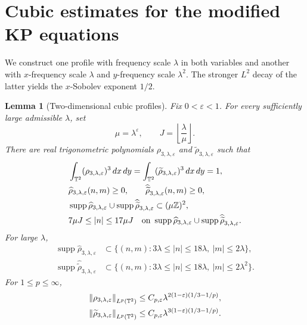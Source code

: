 \documentclass[12pt,reqno,letterpaper]{amsart}
\numberwithin{equation}{section}
\newtheorem{lemma}[theorem]{Lemma}
\theoremstyle{definition}
\newcommand{\T}{\mathbb T}
\newcommand{\Z}{\mathbb Z}
\newcommand{\eps}{\varepsilon}
\newcommand{\la}{\lambda}
\newcommand{\supp}{\operatorname{supp}}
\newcommand{\norm}[1]{\left\lVert #1\right\rVert}
\newcommand{\abs}[1]{\left\lvert #1\right\rvert}
\begin{document}
\section{Cubic estimates for the modified KP equations}


We construct one profile with frequency scale $\la$ in both variables and
another with $x$-frequency scale $\la$ and $y$-frequency scale $\la^2$.
The stronger $L^2$ decay of the latter yields the $x$-Sobolev exponent
$1/2$.

\begin{lemma}[Two-dimensional cubic profiles]\label{lem:cubic-profile}
Fix $0<\eps<1$.  For every sufficiently large admissible $\la$, set
\begin{equation*}
 \mu=\la^\eps,\qquad
 J=\left\lfloor\frac{\la}{\mu}\right\rfloor.
\end{equation*}
There are real trigonometric polynomials
$\rho_{3,\la,\eps}$ and
$\widetilde{\rho}_{3,\la,\eps}$ such that
\begin{align}
 &\int_{\T^2}(\rho_{3,\la,\eps})^3\,dx\,dy
 =\int_{\T^2}(\widetilde{\rho}_{3,\la,\eps})^3\,dx\,dy=1,
 \label{eq:cubic-profile-moment}\\
 &\widehat\rho_{3,\la,\eps}(n,m)\geq0,
 \qquad
 \widehat{\widetilde{\rho}}_{3,\la,\eps}(n,m)\geq0,\notag\\
 &\supp\widehat\rho_{3,\la,\eps}
 \cup\supp\widehat{\widetilde{\rho}}_{3,\la,\eps}
 \subset(\mu\Z)^2,
 \label{eq:cubic-profile-positivity}\\
 &7\mu J\leq\abs n\leq17\mu J
 \quad\text{on }
 \supp\widehat\rho_{3,\la,\eps}
 \cup\supp\widehat{\widetilde{\rho}}_{3,\la,\eps}.
 \label{eq:cubic-profile-support}
\end{align}
For large $\la$,
\begin{equation}\label{eq:cubic-profile-support-bounds}
 \begin{aligned}
 \supp\widehat\rho_{3,\la,\eps}
 &\subset\{(n,m):3\la\leq\abs n\leq18\la,\ \abs m\leq2\la\},\\
 \supp\widehat{\widetilde{\rho}}_{3,\la,\eps}
 &\subset\{(n,m):3\la\leq\abs n\leq18\la,\ \abs m\leq2\la^2\}.
 \end{aligned}
\end{equation}
For $1\leq p\leq\infty$,
\begin{align}
 \norm{\rho_{3,\la,\eps}}_{L^p(\T^2)}
 &\leq C_{p,\eps}\la^{2(1-\eps)(1/3-1/p)},\notag\\
 \norm{\widetilde{\rho}_{3,\la,\eps}}_{L^p(\T^2)}
 &\leq C_{p,\eps}\la^{3(1-\eps)(1/3-1/p)}.
 \label{eq:cubic-profile-Lp}

\end{align}
\end{lemma}
\end{document}
